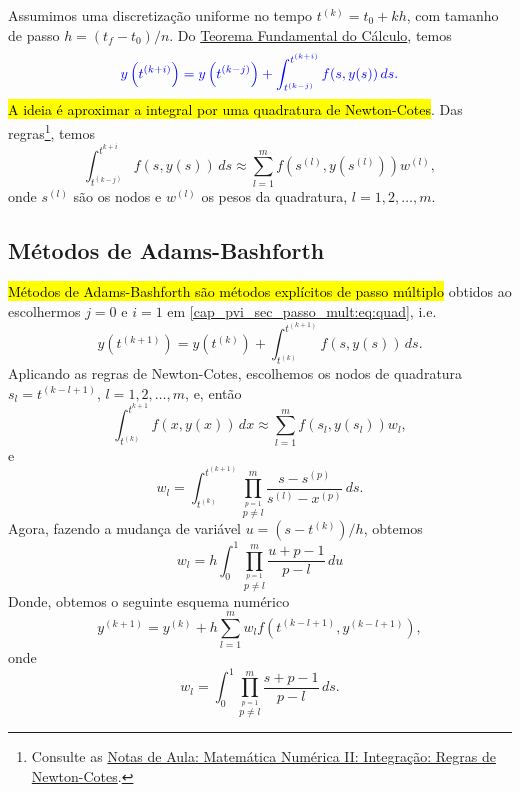 Assumimos uma discretização uniforme no tempo $t^{(k)} = t_0 + kh$, com tamanho de passo $h = (t_f-t_0)/n$. Do \href{https://notaspedrok.com.br/notas/CalculoI/cap_int_sec_propint.html}{Teorema Fundamental do Cálculo}, temos
\begin{equation}\label{cap_pvi_sec_passo_mult:eq:tfc}\color{blue}y\left(t^{(k+i)}\right) = y\left(t^{(k-j)}\right) + \int_{t^{(k-j)}}^{t^{(k+i)}} f(s,y(s))\,ds.
\end{equation}
\hl{A ideia é aproximar a integral por uma quadratura de Newton}{\newton}\hl{-Cotes}{\cotes}. Das regras\footnote{Consulte as \href{https://notaspedrok.com.br/notas/MatematicaNumericaII/cap_integr_sec_NC.html}{Notas de Aula: Matemática Numérica II: Integração: Regras de Newton-Cotes}.}, temos
\begin{equation}\label{cap_pvi_sec_passo_mult:eq:quad}
  \int_{t^{(k-j)}}^{t^{k+i}} f(s,y(s))\,ds \approx \sum_{l=1}^{m} f\left(s^{(l)},y(s^{(l)})\right)w^{(l)},
\end{equation}
onde $s^{(l)}$ são os nodos e $w^{(l)}$ os pesos da quadratura, $l = 1, 2, \dotsc, m$.

\subsection{Métodos de Adams-Bashforth}

\hl{Métodos de Adams-Bashforth são métodos explícitos de passo múltiplo} obtidos ao escolhermos $j=0$ e $i=1$ em \eqref{cap_pvi_sec_passo_mult:eq:quad}, i.e.
\begin{equation}
  y\left(t^{(k+1)}\right) = y\left(t^{(k)}\right) + \int_{t^{(k)}}^{t^{(k+1)}} f(s,y(s))\,ds.
\end{equation}
Aplicando as regras de Newton-Cotes, escolhemos os nodos de quadratura $s_l = t^{(k-l+1)}$, $l = 1, 2, \dotsc, m$, e, então
\begin{equation}
  \int_{t^{(k)}}^{t^{k+1}} f(x,y(x))\,dx \approx \sum_{l=1}^{m} f\left(s_l,y(s_l)\right)w_l,
\end{equation}
e
\begin{equation}
  w_l = \int_{t^{(k)}}^{t^{(k+1)}} \prod_{\overset{p=1}{p\neq l}}^m \frac{s-s^{(p)}}{s^{(l)}-x^{(p)}}\,ds.
\end{equation}
Agora, fazendo a mudança de variável $u=\left(s - t^{(k)}\right)/h$, obtemos
\begin{equation}
  w_l = h\int_{0}^{1} \prod_{\overset{p=1}{p\neq l}}^m \frac{u+p-1}{p-l}\,du
\end{equation}
Donde, obtemos o seguinte esquema numérico
\begin{equation}\label{cap_pvi_sec_passo_mult:eq:mult_passo_iter}
  y^{(k+1)} = y^{(k)} + h\sum_{l=1}^m w_{l}f(t^{(k-l+1)},y^{(k-l+1)}),
\end{equation}
onde
\begin{equation}
  w_l = \int_{0}^{1} \prod_{\overset{p=1}{p\neq l}}^m \frac{s+p-1}{p-l}\,ds.\label{cap_pvi_sec_passo_mult:eq:mult_passo_pesos}
\end{equation}

